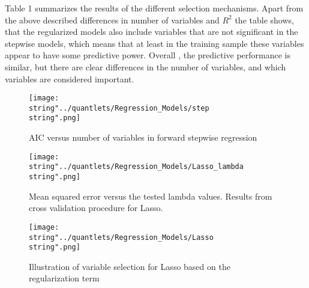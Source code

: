Table 1 summarizes the results of the different selection mechanisms. Apart from the above described differences in number of variables and  $R^{2}$ the table shows, that the regularized models also include variables that are not significant in the stepwise models, which means that at least in the training sample these variables appear to have some predictive power. Overall , the predictive performance is similar, but there are clear differences in the number of variables, and which variables are considered important. 
\FloatBarrier
\begin{figure}[H]
  \centering
\texttt{[image: \\string"../quantlets/Regression\_Models/step\\string".png]}
  \caption{AIC versus number of variables in forward stepwise regression}\label{fig:step}
\end{figure}
 
\begin{figure}[H]
  \centering
\texttt{[image: \\string"../quantlets/Regression\_Models/Lasso\_lambda\\string".png]}
  \caption{Mean squared error versus the tested lambda values. Results from cross validation procedure for Lasso.}\label{fig:Lasso}
\end{figure}

\begin{figure}[H]
  \centering
\texttt{[image: \\string"../quantlets/Regression\_Models/Lasso\\string".png]}
  \caption{Illustration of variable selection for Lasso based on the regularization term}\label{fig:Lasso1}
\end{figure}

 
\label{table:regs}
 

 
\FloatBarrier